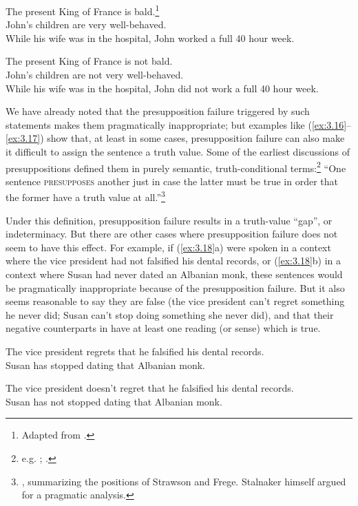 \ea \label{ex:3.16}
\ea The present King of France is bald.\footnote{Adapted from \citet{Russell1905}.} \\
\ex John’s children are very well-behaved.\\
\ex While his wife was in the hospital, John worked a full 40 hour week.
                       \z
\z

\ea \label{ex:3.17}
\ea The present King of France is not bald.\\
\ex John’s children are not very well-behaved.\\
\ex While his wife was in the hospital, John did not work a full 40 hour week.
                       \z
\z


We have already noted that the presupposition failure triggered by such statements makes them pragmatically inappropriate; but examples like (\ref{ex:3.16}--\ref{ex:3.17}) show that, at least in some cases, presupposition failure can also make it difficult to assign the sentence a truth value. Some of the earliest discussions of presuppositions defined them in purely semantic, truth-conditional terms:\footnote{e.g. \citet{Frege1892}; \citet{Strawson1950,Strawson1952}.} “One sentence \textsc{presupposes} another just in case the latter must be true in order that the former have a truth value at all.”\footnote{\citet[447]{Stalnaker1973}, summarizing the positions of Strawson and Frege. Stalnaker himself argued for a pragmatic analysis.}



Under this definition, presupposition failure results in a truth-value “gap”, or indeterminacy. But there are other cases where presupposition failure does not seem to have this effect. For example, if (\ref{ex:3.18}a) were spoken in a context where the vice president had not falsified his dental records, or (\ref{ex:3.18}b) in a context where Susan had never dated an Albanian monk, these sentences would be pragmatically inappropriate because of the presupposition failure. But it also seems reasonable to say they are false (the vice president can’t regret something he never did; Susan can’t stop doing something she never did), and that their negative counterparts in  have at least one reading (or sense) which is true. 


\ea \label{ex:3.18}
\ea The vice president regrets that he falsified his dental records.\\
\ex Susan has stopped dating that Albanian monk.
\z
                       \z

\ea \label{ex:3.19}
\ea The vice president doesn’t regret that he falsified his dental records.\\
\ex Susan has not stopped dating that Albanian monk.
                       \z
\z


